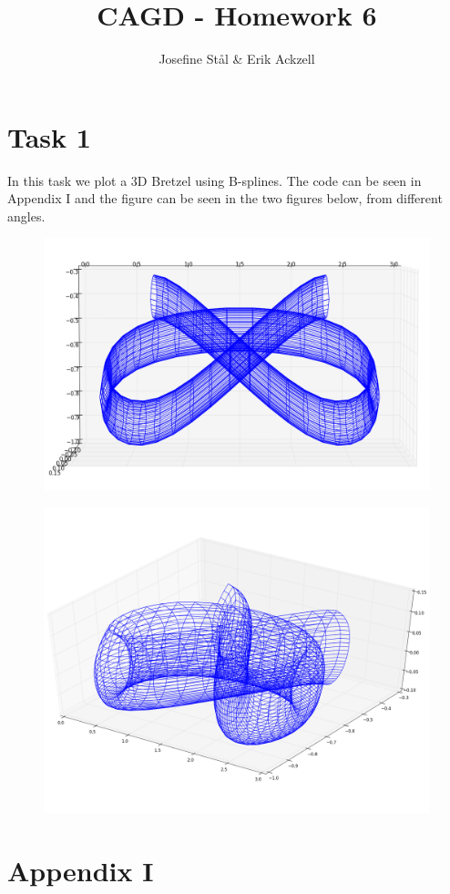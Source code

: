 \documentclass[]{article}
\title{CAGD - Homework 6}
\author{Josefine St{\aa}l \& Erik Ackzell}
\begin{document}
\maketitle
\section*{Task 1}
In this task we plot a 3D Bretzel using B-splines. The code can be seen in Appendix I and the figure can be seen in the two figures below, from different angles.\\

\begin{figure}[h!]
	\includegraphics[scale=0.3]{bretzel3d2}
\end{figure}
\begin{figure}[h!]
	\includegraphics[scale=0.3]{bretzel3d}
\end{figure}

\newpage
\section*{Appendix I}

\end{document}
